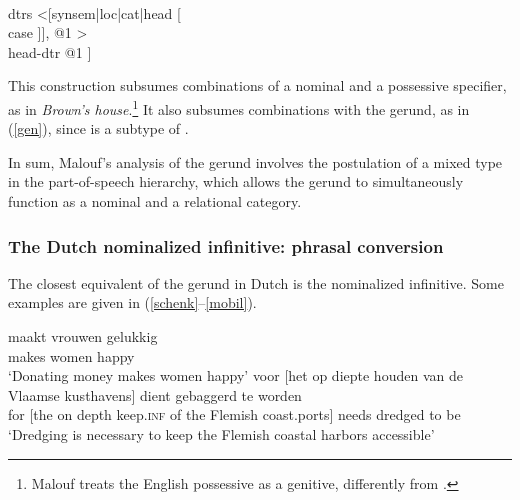 \documentclass[output=paper
                ,modfonts
                ,nonflat
	        ,collection
	        ,collectionchapter
	        ,collectiontoclongg
 	        ,biblatex
                ,babelshorthands
                ,newtxmath
                ,draftmode
                ,colorlinks, citecolor=brown
]{./langsci/langscibook}
\begin{document}
\begin{exe} 
\ex\label{gencx} 
\begin{avm} 
[\type{noun-poss-cx}                                      \\
 synsem|loc [cat|head \type{noun}                       \\
             content \type{nom-obj}]                    \\
 dtrs <[synsem|loc|cat|head [                \\
                               case ]], @1 > \\
 head-dtr @1 ] 
\end{avm}
\end{exe}
 
\noindent
This construction subsumes combinations of a nominal and a 
possessive specifier, as in \emph{Brown's house}.\footnote{Malouf treats 
the English possessive as a genitive, differently from \citet{SagWasow03}.}   
It also subsumes combinations with the gerund, as in (\ref{gen}), since 
 is a subtype of .  

In sum, Malouf's analysis of the gerund involves the postulation of a
mixed type in the part-of-speech hierarchy, which allows the gerund to simultaneously
function as a nominal and a relational category. 


\subsubsection{The Dutch nominalized infinitive: phrasal conversion } 


The closest equivalent of the gerund in Dutch is the nominalized infinitive. 
Some examples are given in (\ref{schenk}--\ref{mobil}). 

\begin{exe} 
\ex\label{schenk} 
 maakt vrouwen gelukkig  \\
       [money donate.\textsc{inf}] makes women happy \\
\trans `Donating money makes women happy' 
\ex\label{mobil}   
\gll   voor [het op diepte houden van de Vlaamse kusthavens] dient gebaggerd te worden  \\  
       for [the on depth keep.\textsc{inf} of the Flemish coast.ports] needs dredged to be \\
\trans `Dredging is necessary to keep the Flemish coastal harbors accessible'  
\end{exe} 
\end{document}
